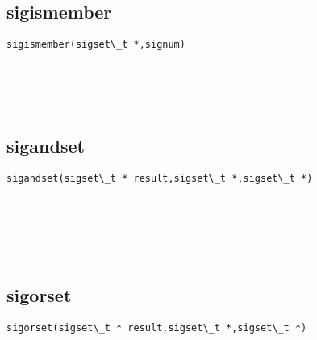 \documentclass[10pt,a4paper]{article}
\begin{document}
\subsection{sigismember}
\begin{spacing}{2.0}
\lstset{language=C,numbers=none}
\begin{lstlisting}
sigismember(sigset\_t *,signum)
\end{lstlisting}
{\large\color[rgb]{0.2,0.4,0.6}{*:}} \\
{\large\color[rgb]{0.2,0.4,0.6}{signum:}}
\paragraph{ \ \ }
\end{spacing}

\subsection{sigandset}
\begin{spacing}{2.0}
\lstset{language=C,numbers=none}
\begin{lstlisting}
sigandset(sigset\_t * result,sigset\_t *,sigset\_t *)
\end{lstlisting}
{\large\color[rgb]{0.2,0.4,0.6}{result:}} \\
{\large\color[rgb]{0.2,0.4,0.6}{*:}} \\
{\large\color[rgb]{0.2,0.4,0.6}{*:}}
\paragraph{ \ \ }
\end{spacing}

\subsection{sigorset}
\begin{spacing}{2.0}
\lstset{language=C,numbers=none}
\begin{lstlisting}
sigorset(sigset\_t * result,sigset\_t *,sigset\_t *)
\end{lstlisting}
{\large\color[rgb]{0.2,0.4,0.6}{result:}} \\
{\large\color[rgb]{0.2,0.4,0.6}{*:}} \\
{\large\color[rgb]{0.2,0.4,0.6}{*:}}
\paragraph{ \ \ }
\end{spacing}
\end{document}
